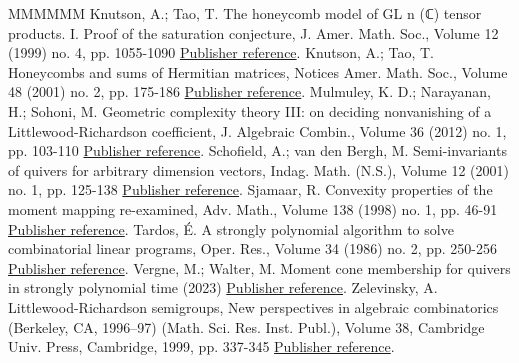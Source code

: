 \documentclass[11pt]{article}
\theoremstyle{definition}
\numberwithin{equation}{section}
\begin{document}
\begin{thebibliography}{MMMMMM}
 Knutson, A.; Tao, T. The honeycomb model of  GL  n (ℂ) tensor products. I. Proof of the saturation conjecture, J. Amer. Math. Soc., Volume 12 (1999) no. 4, pp. 1055-1090 \href{https://alco.centre-mersenne.org/articles/10.5802/alco.398/#KT}{Publisher reference}.
 Knutson, A.; Tao, T. Honeycombs and sums of Hermitian matrices, Notices Amer. Math. Soc., Volume 48 (2001) no. 2, pp. 175-186 \href{https://alco.centre-mersenne.org/articles/10.5802/alco.398/#KT2}{Publisher reference}.
 Mulmuley, K. D.; Narayanan, H.; Sohoni, M. Geometric complexity theory III: on deciding nonvanishing of a Littlewood-Richardson coefficient, J. Algebraic Combin., Volume 36 (2012) no. 1, pp. 103-110 \href{https://alco.centre-mersenne.org/articles/10.5802/alco.398/#MNS}{Publisher reference}.
 Schofield, A.; van den Bergh, M. Semi-invariants of quivers for arbitrary dimension vectors, Indag. Math. (N.S.), Volume 12 (2001) no. 1, pp. 125-138 \href{https://alco.centre-mersenne.org/articles/10.5802/alco.398/#SVB}{Publisher reference}.
 Sjamaar, R. Convexity properties of the moment mapping re-examined, Adv. Math., Volume 138 (1998) no. 1, pp. 46-91 \href{https://alco.centre-mersenne.org/articles/10.5802/alco.398/#Sj}{Publisher reference}.
 Tardos, É. A strongly polynomial algorithm to solve combinatorial linear programs, Oper. Res., Volume 34 (1986) no. 2, pp. 250-256 \href{https://alco.centre-mersenne.org/articles/10.5802/alco.398/#Tar86}{Publisher reference}.
 Vergne, M.; Walter, M. Moment cone membership for quivers in strongly polynomial time (2023) \href{https://alco.centre-mersenne.org/articles/10.5802/alco.398/#Ver-Wal-2023}{Publisher reference}.
 Zelevinsky, A. Littlewood-Richardson semigroups, New perspectives in algebraic combinatorics (Berkeley, CA, 1996–97) (Math. Sci. Res. Inst. Publ.), Volume 38, Cambridge Univ. Press, Cambridge, 1999, pp. 337-345 \href{https://alco.centre-mersenne.org/articles/10.5802/alco.398/#Zel-1999}{Publisher reference}.
\end{thebibliography}
\end{document}
